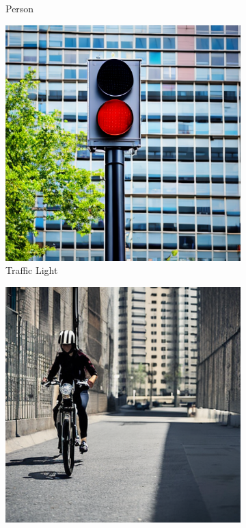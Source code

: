 \begin{figure}
\begin{subfigure}{0.24\columnwidth}
   \caption{Person}
   \label{subfig:dataset-example-person}
  \end{subfigure}
  \begin{subfigure}{0.24\columnwidth}
   \includegraphics[width=\columnwidth]{img/4-experiments/dataset_example_traffic light.png}
   \caption{Traffic Light}
   \label{subfig:dataset-example-traffic}
  \end{subfigure}
  \begin{subfigure}{0.24\columnwidth}
   \includegraphics[width=\columnwidth]{img/4-experiments/dataset_example_rider.png}

\end{subfigure}
\end{figure}
